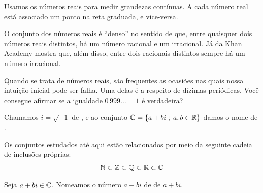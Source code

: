 Usamos os números reais para medir grandezas contínuas. A cada número real está associado um ponto na reta graduada, e vice-versa. 

O conjunto dos números reais é ``denso'' no sentido de que, entre quaisquer dois números reais distintos, há um número racional e um irracional. Já  da Khan Academy mostra que, além disso, entre dois racionais distintos sempre há um número irracional.

Quando se trata de números reais, são frequentes as ocasiões nas quais nossa intuição inicial pode ser falha. Uma delas é a respeito de dízimas periódicas. Você consegue afirmar se a igualdade $0\,999\ldots=1$ é verdadeira?

\begin{definition}
Chamamos $i = \sqrt {-1}$ de , e ao conjunto $\mathbb{C} = \left\{  a+bi \;;\; a,b \in \mathbb{R}\right\}$ damos o nome de .
\end{definition}

Os conjuntos estudados até aqui estão relacionados por meio da seguinte cadeia de inclusões próprias:
%
\begin{align*}
\mathbb{N} \subset \mathbb{Z} \subset \mathbb{Q} \subset \mathbb{R} \subset \mathbb{C}
\end{align*}

\begin{definition}
Seja $a+bi \in \mathbb{C}$. Nomeamos o número $a-bi$ de  de $a+bi$.
\end{definition}